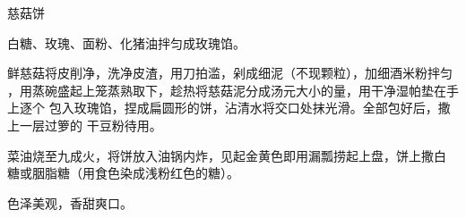 \begin{recipe}{慈菇饼}

\ingredients


\preparation

\step 白糖、玫瑰、面粉、化猪油拌匀成玫瑰馅。

\step 鲜慈菇将皮削净，洗净皮渣，用刀拍滥，剁成细泥（不现颗粒），加细酒米粉拌匀
，用蒸碗盛起上笼蒸熟取下，趁热将慈菇泥分成汤元大小的量，用干净湿帕垫在手上逐个
包入玫瑰馅，捏成扁圆形的饼，沾清水将交口处抹光滑。全部包好后，撒上一层过箩的
干豆粉待用。

\step 菜油烧至九成火，将饼放入油锅内炸，见起金黄色即用漏瓢捞起上盘，饼上撒白
糖或胭脂糖（用食色染成浅粉红色的糖）。

\features

色泽美观，香甜爽口。

\end{recipe}

